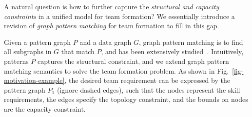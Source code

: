 
A natural question is how to further capture the {\em structural and capacity constraints} in a unified model for team formation?
We essentially introduce a revision of {\em graph pattern matching} for team formation to fill in this gap.

Given a pattern graph $P$ and a data graph $G$, graph pattern matching is to find all subgraphs in $G$ that match $P$, and has been extensively studied~\cite{Ullmann76,infsimu95,FanLMTWW10,MaCFHW14,Guanfeng15,FanCount16}.  Intuitively, patterns $P$ captures the structural constraint, and we extend graph pattern matching semantics to solve the team formation problem. As shown in Fig.~\ref{fig-motivation-example},  the desired team requirement can be expressed by the pattern graph $P_1$ (ignore dashed edges), such that the nodes represent the skill requirements, the edges specify the topology constraint, and the bounds on nodes are the capacity constraint.


